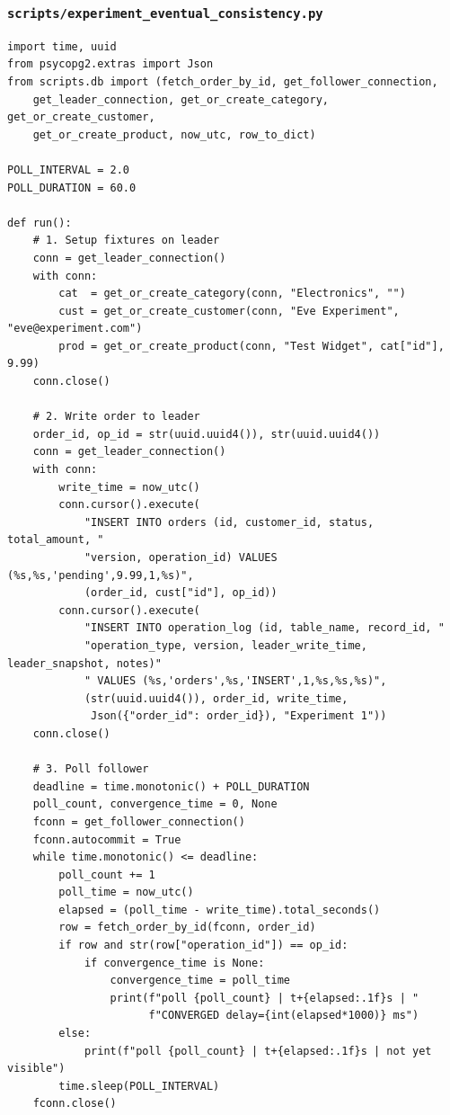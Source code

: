 \documentclass[12pt,a4paper]{article}
\begin{document}
\subsubsection{\texttt{scripts/experiment\_eventual\_consistency.py}}
\begin{lstlisting}[style=pythonstyle]
import time, uuid
from psycopg2.extras import Json
from scripts.db import (fetch_order_by_id, get_follower_connection,
    get_leader_connection, get_or_create_category, get_or_create_customer,
    get_or_create_product, now_utc, row_to_dict)

POLL_INTERVAL = 2.0
POLL_DURATION = 60.0

def run():
    # 1. Setup fixtures on leader
    conn = get_leader_connection()
    with conn:
        cat  = get_or_create_category(conn, "Electronics", "")
        cust = get_or_create_customer(conn, "Eve Experiment", "eve@experiment.com")
        prod = get_or_create_product(conn, "Test Widget", cat["id"], 9.99)
    conn.close()

    # 2. Write order to leader
    order_id, op_id = str(uuid.uuid4()), str(uuid.uuid4())
    conn = get_leader_connection()
    with conn:
        write_time = now_utc()
        conn.cursor().execute(
            "INSERT INTO orders (id, customer_id, status, total_amount, "
            "version, operation_id) VALUES (%s,%s,'pending',9.99,1,%s)",
            (order_id, cust["id"], op_id))
        conn.cursor().execute(
            "INSERT INTO operation_log (id, table_name, record_id, "
            "operation_type, version, leader_write_time, leader_snapshot, notes)"
            " VALUES (%s,'orders',%s,'INSERT',1,%s,%s,%s)",
            (str(uuid.uuid4()), order_id, write_time,
             Json({"order_id": order_id}), "Experiment 1"))
    conn.close()

    # 3. Poll follower
    deadline = time.monotonic() + POLL_DURATION
    poll_count, convergence_time = 0, None
    fconn = get_follower_connection()
    fconn.autocommit = True
    while time.monotonic() <= deadline:
        poll_count += 1
        poll_time = now_utc()
        elapsed = (poll_time - write_time).total_seconds()
        row = fetch_order_by_id(fconn, order_id)
        if row and str(row["operation_id"]) == op_id:
            if convergence_time is None:
                convergence_time = poll_time
                print(f"poll {poll_count} | t+{elapsed:.1f}s | "
                      f"CONVERGED delay={int(elapsed*1000)} ms")
        else:
            print(f"poll {poll_count} | t+{elapsed:.1f}s | not yet visible")
        time.sleep(POLL_INTERVAL)
    fconn.close()
\end{lstlisting}
\end{document}
